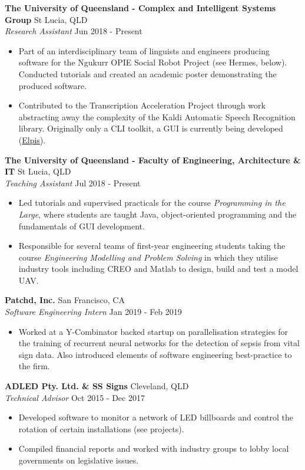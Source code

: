 \documentclass[a4paper]{article}
\newenvironment{myitemize}
{   \small
    \vspace{-2pt}
    \begin{itemize}
    \setlength{\itemsep}{0pt}
    \setlength{\parskip}{0pt}
    \setlength{\parsep}{0pt}     }
{ \end{itemize}                  }
\begin{document}
\textbf{The University of Queensland - Complex and Intelligent Systems Group} \hfill St Lucia, QLD\\
\textit{Research Assistant} \hfill Jun 2018 - Present\\
\begin{myitemize} \itemsep 0.75mm
	\item Part of an interdisciplinary team of linguists and engineers producing software for the Ngukurr OPIE Social Robot Project (see Hermes, below). Conducted tutorials and created an academic poster demonstrating the produced software.
	\item Contributed to the Transcription Acceleration Project through work abstracting away the complexity of the Kaldi Automatic Speech Recognition library. Originally only a CLI toolkit, a GUI is currently being developed (\href{https://github.com/CoEDL/elpis}{Elpis}).
\end{myitemize}
\vspace{-1mm}
\textbf{The University of Queensland - Faculty of Engineering, Architecture \& IT} \hfill St Lucia, QLD\\
\textit{Teaching Assistant} \hfill Jul 2018 - Present\\
\begin{myitemize} \itemsep 0.75mm
	\item Led tutorials and supervised practicals for the course \textit{Programming in the Large}, where students are taught Java, object-oriented programming and the fundamentals of GUI development.
	\item Responsible for several teams of first-year engineering students taking the course \textit{Engineering Modelling and Problem Solving} in which they utilise industry tools including CREO and Matlab to design, build and test a model UAV.
\end{myitemize}
\vspace{-1mm}
\textbf{Patchd, Inc.} \hfill San Francisco, CA\\
\textit{Software Engineering Intern} \hfill  Jan 2019 - Feb 2019\\
\begin{myitemize} \itemsep 0.75mm
	\item Worked at a Y-Combinator backed startup on parallelisation strategies for the training of recurrent neural networks for the detection of sepsis from vital sign data. Also introduced elements of software engineering best-practice to the firm.
\end{myitemize}
\vspace{-1mm}
\textbf{ADLED Pty. Ltd. \& SS Signs} \hfill Cleveland, QLD\\
\textit{Technical Advisor} \hfill Oct 2015 - Dec 2017\\
\begin{myitemize} \itemsep 0.75mm
	\item Developed software to monitor a network of LED billboards and control the rotation of certain installations (see projects).
	\item Compiled financial reports and worked with industry groups to lobby local governments on legislative issues.
\end{myitemize}
\end{document}
